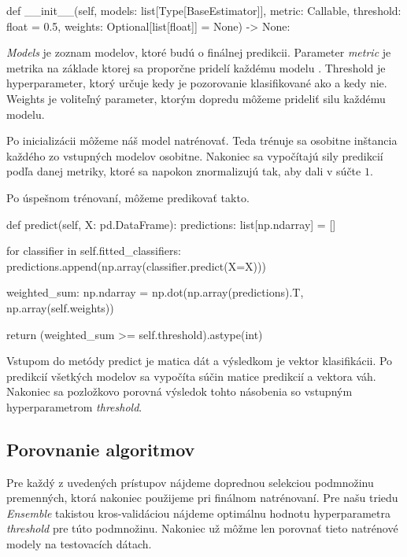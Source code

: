 \documentclass[main.tex]{subfiles}
\begin{document}
\begin{python}
    def __init__(self, models: list[Type[BaseEstimator]],
             metric: Callable, threshold: float = 0.5,
             weights: Optional[list[float]] = None) -> None:
\end{python}
\textit{Models} je zoznam modelov, ktoré budú  o finálnej predikcii. Parameter \textit{metric} je metrika na základe ktorej sa  proporčne pridelí každému modelu . Threshold je hyperparameter, ktorý určuje kedy je pozorovanie klasifikované ako  a kedy nie. Weights je voliteľný parameter, ktorým dopredu môžeme prideliť silu každému modelu.

Po inicializácii môžeme náš  model natrénovať. Teda trénuje sa osobitne inštancia každého zo vstupných modelov osobitne. Nakoniec sa vypočítajú sily predikcií podľa danej metriky, ktoré sa napokon znormalizujú tak, aby dali v súčte $1$. 

Po úspešnom trénovaní, môžeme predikovať takto.
\begin{python}
    def predict(self, X: pd.DataFrame):
    predictions: list[np.ndarray] = []

    for classifier in self.fitted_classifiers:
        predictions.append(np.array(classifier.predict(X=X)))
    
    weighted_sum: np.ndarray = np.dot(np.array(predictions).T, np.array(self.weights))

    return (weighted_sum >= self.threshold).astype(int)
\end{python}
Vstupom do metódy predict je matica dát a výsledkom je vektor klasifikácii. Po predikcií všetkých modelov sa vypočíta súčin matice predikcií a vektora váh. Nakoniec sa pozložkovo porovná výsledok tohto násobenia so vstupným hyperparametrom \textit{threshold}.

\subsection{Porovnanie algoritmov}

Pre každý z uvedených prístupov nájdeme doprednou selekciou podmnožinu premenných, ktorá nakoniec použijeme pri finálnom natrénovaní. Pre našu triedu \textit{Ensemble} takistou kros-validáciou nájdeme optimálnu hodnotu hyperparametra \textit{threshold} pre túto podmnožinu. Nakoniec už môžme len porovnať tieto natrénové modely na testovacích dátach.
\end{document}
